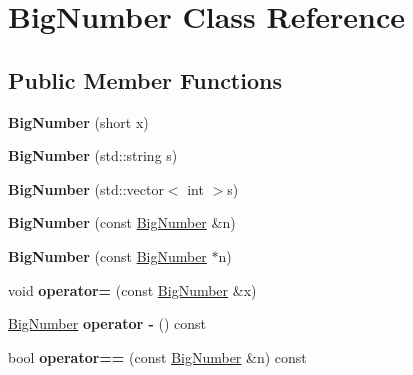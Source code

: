\hypertarget{class_big_number}{}\section{Big\+Number Class Reference}
\label{class_big_number}
\subsection*{Public Member Functions}
\begin{DoxyCompactItemize}
\item 
\mbox{\label{class_big_number_a72248c481090682b5d8f78408a323f98}} 
{\bfseries Big\+Number} (short x)
\item 
\mbox{\label{class_big_number_a876ec7667ece8c8b4693f8e5d59700b2}} 
{\bfseries Big\+Number} (std\+::string s)
\item 
\mbox{\label{class_big_number_a9579bf9e1a34ff9546145809cb08c4d2}} 
{\bfseries Big\+Number} (std\+::vector$<$ int $>$s)
\item 
\mbox{\label{class_big_number_a9184e9a8963b01cf47f7fc01d13fbede}} 
{\bfseries Big\+Number} (const \mbox{\hyperlink{class_big_number}{Big\+Number}} \&n)
\item 
\mbox{\label{class_big_number_ad8d71044301d356b85003951bc9bcc27}} 
{\bfseries Big\+Number} (const \mbox{\hyperlink{class_big_number}{Big\+Number}} $\ast$n)
\item 
\mbox{\label{class_big_number_a9a33aea4aba378d0899d037d7cf0b2cf}} 
void {\bfseries operator=} (const \mbox{\hyperlink{class_big_number}{Big\+Number}} \&x)
\item 
\mbox{\label{class_big_number_aae14acf3d262a99b932a0ac52270312c}} 
\mbox{\hyperlink{class_big_number}{Big\+Number}} {\bfseries operator -\/} () const
\item 
\mbox{\label{class_big_number_a68d284a99669593b87ac1e8d386bd596}} 
bool {\bfseries operator==} (const \mbox{\hyperlink{class_big_number}{Big\+Number}} \&n) const
\item 
\mbox{\label{class_big_number_a45cdbdb56767045a945e9401015e9efc}} 

\end{DoxyCompactItemize}
